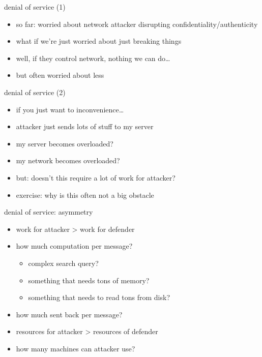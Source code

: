 \begin{frame}{denial of service (1)}
    \begin{itemize}
    \item so far: worried about network attacker disrupting confidentiality/authenticity
        \vspace{.5cm}
    \item what if we're just worried about just breaking things
    \item well, if they control network, nothing we can do\ldots 
    \item but often worried about less
    \end{itemize}
\end{frame}

\begin{frame}{denial of service (2)}
    \begin{itemize}
    \item if you just want to inconvenience\ldots
    \item attacker just sends lots of stuff to my server
    \item my server becomes overloaded?
    \item my network becomes overloaded?
    \vspace{.5cm}
    \item but: doesn't this require a lot of work for attacker?
    \item exercise: why is this often not a big obstacle
    \end{itemize}
\end{frame}

\begin{frame}{denial of service: asymmetry}
    \begin{itemize}
    \item work for attacker > work for defender
    \item how much computation per message?
        \begin{itemize}
        \item complex search query?
        \item something that needs tons of memory?
        \item something that needs to read tons from disk?
        \end{itemize}
    \item how much sent back per message?
    \vspace{.5cm}
    \item resources for attacker > resources of defender
    \item how many machines can attacker use?
    \end{itemize}
\end{frame}

